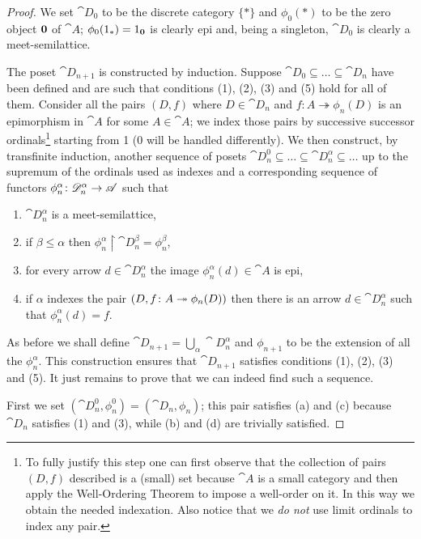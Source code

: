 \begin{proof}
  We set \(\cat{D}_0\) to be the discrete category \(\{*\}\) and \(\phi_0(*)\) to be the zero object \({\bf 0}\) of \(\cat{A}\); \(\phi_0(1_*) = 1_{\bf 0}\) is clearly epi and, being a singleton, \(\cat{D}_0\) is clearly a meet-semilattice.

  The poset \(\cat{D}_{n+1}\) is constructed by induction. Suppose \(\cat{D}_0\subseteq\ldots\subseteq\cat{D}_n\) have been defined and are such that conditions (1), (2), (3) and (5) hold for all of them. Consider all the pairs \((D, f)\) where \(D\in\cat{D}_n\) and \(f\colon A\twoheadrightarrow\phi_n(D)\) is an epimorphism in \(\cat{A}\) for some \(A\in\cat{A}\); we index those pairs by successive successor ordinals\footnote{To fully justify this step one can first observe that the collection of pairs \((D, f)\) described is a (small) set because \(\cat{A}\) is a small category and then apply the Well-Ordering Theorem to impose a well-order on it. In this way we obtain the needed indexation. Also notice that we \emph{do not} use limit ordinals to index any pair.} starting from 1 (0 will be handled differently). We then construct, by transfinite induction, another sequence of posets \(\cat{D}_n^0\subseteq\ldots\subseteq\cat{D}_n^\alpha\subseteq\ldots\) up to the supremum of the ordinals used as indexes and a corresponding sequence of functors \(\phi_n^\alpha\colon {\mathscr D}_n^\alpha\to {\mathscr A}\) such that
  \begin{enumerate}[label=(\alph*)]
  \item \(\cat{D}_n^\alpha\) is a meet-semilattice,
  \item if \(\beta\leq\alpha\) then \(\phi_n^\alpha\upharpoonright\cat{D}_n^\beta = \phi_n^\beta\),
  \item for every arrow \(d\in\cat{D}_n^\alpha\) the image \(\phi_n^\alpha(d)\in\cat{A}\) is epi,
  \item if \(\alpha\) indexes the pair \((D,f\colon A\twoheadrightarrow \phi_n(D))\) then there is an arrow \(d\in\cat{D}_n^\alpha\) such that \(\phi_n^\alpha(d) = f\).
  \end{enumerate}
  As before we shall define \(\cat{D}_{n+1}=\bigcup_\alpha\cat{D}_n^\alpha\) and \(\phi_{n+1}\) to be the extension of all the \(\phi_n^\alpha\). This construction ensures that \(\cat{D}_{n+1}\) satisfies conditions (1), (2), (3) and (5). It just remains to prove that we can indeed find such a sequence.

  First we set \((\cat{D}_n^0, \phi_n^0) = (\cat{D}_n, \phi_n)\); this pair satisfies (a) and (c) because \(\cat{D}_n\) satisfies (1) and (3), while (b) and (d) are trivially satisfied.


\end{proof}
